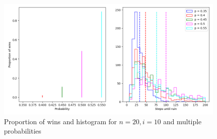 \begin{figure}
\begin{center}
\includegraphics[width=\textwidth]{gamblers_ruin-02}
\end{center}
\caption{Proportion of wins and histogram for $n=20, i=10$ and multiple probabilities}\label{f.gambler-hist2}
\end{figure}
